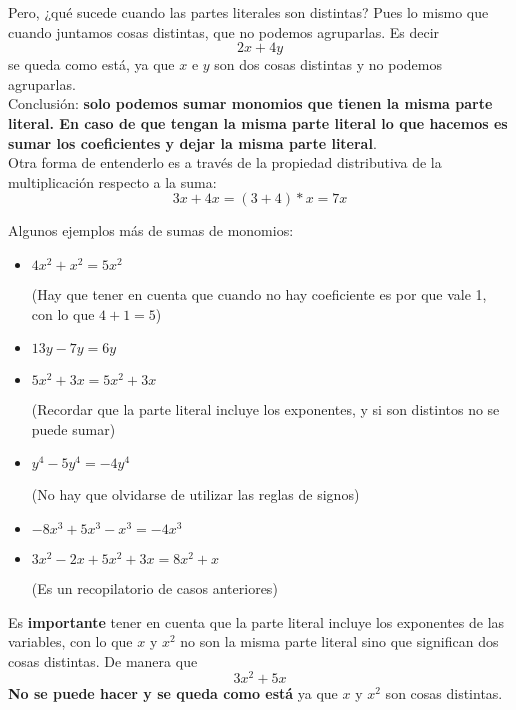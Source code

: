 \documentclass[a4paper,11pt,answers]{exam}
\begin{document}
  Pero, ¿qué sucede cuando las partes literales son distintas? Pues lo mismo que cuando juntamos cosas distintas, que no podemos agruparlas. Es decir
  \[2x + 4y\]
  se queda como está, ya que $x$ e $y$ son dos cosas distintas y no podemos agruparlas.\\

  Conclusión: \textbf{solo podemos sumar monomios que tienen la misma parte literal. En caso de que tengan la misma parte literal lo que hacemos es sumar los coeficientes y dejar la misma parte literal}.\\

  Otra forma de entenderlo es a través de la propiedad distributiva de la multiplicación respecto a la suma:
  \[3x + 4x = (3+4)*x = 7x\]

  Algunos ejemplos más de sumas de monomios:
  \begin{solution}
    \begin{itemize}
    \item $4x^2 + x^2 = 5x^2$ \begin{small}
	(Hay que tener en cuenta que cuando no hay coeficiente es por que vale 1, con lo que $4+1=5$)
      \end{small}
    \item $13y - 7y = 6y$
    \item $5x^2 + 3x = 5x^2 + 3x$ \begin{small}
	(Recordar que la parte literal incluye los exponentes, y si son distintos no se puede sumar)
      \end{small}
    \item $y^4 - 5y^4 = -4y^4$ \begin{small}
	(No hay que olvidarse de utilizar las reglas de signos)
      \end{small}
    \item $-8x^3 + 5x^3 - x^3 = -4x^3$
    \item $3x^2- 2x + 5x^2 + 3x = 8x^2 + x$ \begin{small}
	(Es un recopilatorio de casos anteriores)
      \end{small}
    \end{itemize}
  \end{solution}
  Es \textbf{importante} tener en cuenta que la parte literal incluye los exponentes de las variables, con lo que $x$ y $x^2$ no son la misma parte literal sino que significan dos cosas distintas. De manera que
  \[3x^2 + 5x\]
  \textbf{No se puede hacer y se queda como está} ya que $x$ y $x^2$ son cosas distintas.
\end{document}
